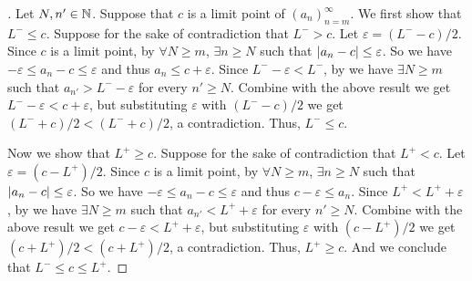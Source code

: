 \begin{proof}[]
  Let \(N, n' \in \mathbb{N}\).
  Suppose that \(c\) is a limit point of \((a_n)_{n = m}^\infty\).
  We first show that \(L^- \leq c\).
  Suppose for the sake of contradiction that \(L^- > c\).
  Let \(\varepsilon = (L^- - c) / 2\).
  Since \(c\) is a limit point, by  \(\forall N \geq m\), \(\exists n \geq N\) such that \(\left\lvert a_n - c\right\rvert \leq \varepsilon\).
  So we have \(-\varepsilon \leq a_n - c \leq \varepsilon\) and thus \(a_n \leq c + \varepsilon\).
  Since \(L^- - \varepsilon < L^-\), by  we have \(\exists N \geq m\) such that \(a_{n'} > L^- - \varepsilon\) for every \(n' \geq N\).
  Combine with the above result we get \(L^- - \varepsilon < c + \varepsilon\), but substituting \(\varepsilon\) with \((L^- - c) / 2\) we get \((L^- + c) / 2 < (L^- + c) / 2\), a contradiction.
  Thus, \(L^- \leq c\).

  Now we show that \(L^+ \geq c\).
  Suppose for the sake of contradiction that \(L^+ < c\).
  Let \(\varepsilon = (c - L^+) / 2\).
  Since \(c\) is a limit point, by  \(\forall N \geq m\), \(\exists n \geq N\) such that \(\left\lvert a_n - c\right\rvert \leq \varepsilon\).
  So we have \(-\varepsilon \leq a_n - c \leq \varepsilon\) and thus \(c - \varepsilon \leq a_n\).
  Since \(L^+ < L^+ + \varepsilon\), by  we have \(\exists N \geq m\) such that \(a_{n'} < L^+ + \varepsilon\) for every \(n' \geq N\).
  Combine with the above result we get \(c - \varepsilon < L^+ + \varepsilon\), but substituting \(\varepsilon\) with \((c - L^+) / 2\) we get \((c + L^+) / 2 < (c + L^+) / 2\), a contradiction.
  Thus, \(L^+ \geq c\).
  And we conclude that \(L^- \leq c \leq L^+\).
\end{proof}

